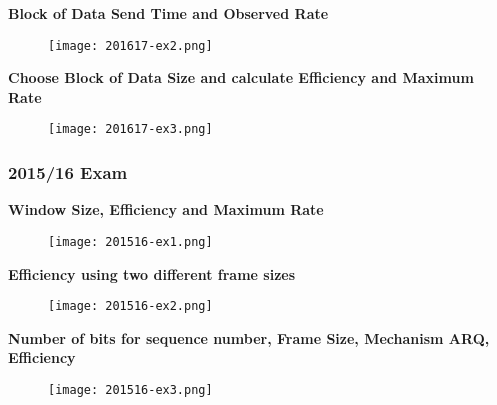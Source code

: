 \documentclass[../resumosRCOM.tex]{subfiles}
\begin{document}
\textbf{Block of Data Send Time and Observed Rate}
\begin{figure}[H]
    \centering
    \texttt{[image: 201617-ex2.png]}
\end{figure}

\textbf{Choose Block of Data Size and calculate Efficiency and Maximum Rate}
\begin{figure}[H]
    \centering
    \texttt{[image: 201617-ex3.png]}
\end{figure}

\subsubsection{2015/16 Exam}

\textbf{Window Size, Efficiency and Maximum Rate}
\begin{figure}[H]
    \centering
    \texttt{[image: 201516-ex1.png]}
\end{figure}

\textbf{Efficiency using two different frame sizes}
\begin{figure}[H]
    \centering
    \texttt{[image: 201516-ex2.png]}
\end{figure}

\textbf{Number of bits for sequence number, Frame Size, Mechanism ARQ, Efficiency}
\begin{figure}[H]
    \centering
    \texttt{[image: 201516-ex3.png]}
\end{figure}
\end{document}
